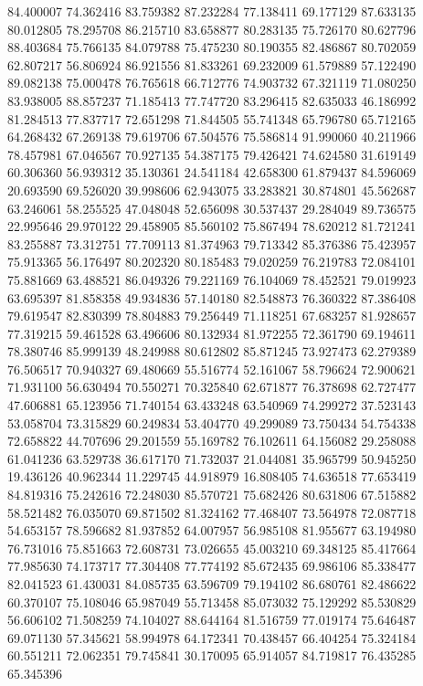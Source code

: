 84.400007
74.362416
83.759382
87.232284
77.138411
69.177129
87.633135
80.012805
78.295708
86.215710
83.658877
80.283135
75.726170
80.627796
88.403684
75.766135
84.079788
75.475230
80.190355
82.486867
80.702059
62.807217
56.806924
86.921556
81.833261
69.232009
61.579889
57.122490
89.082138
75.000478
76.765618
66.712776
74.903732
67.321119
71.080250
83.938005
88.857237
71.185413
77.747720
83.296415
82.635033
46.186992
81.284513
77.837717
72.651298
71.844505
55.741348
65.796780
65.712165
64.268432
67.269138
79.619706
67.504576
75.586814
91.990060
40.211966
78.457981
67.046567
70.927135
54.387175
79.426421
74.624580
31.619149
60.306360
56.939312
35.130361
24.541184
42.658300
61.879437
84.596069
20.693590
69.526020
39.998606
62.943075
33.283821
30.874801
45.562687
63.246061
58.255525
47.048048
52.656098
30.537437
29.284049
89.736575
22.995646
29.970122
29.458905
85.560102
75.867494
78.620212
81.721241
83.255887
73.312751
77.709113
81.374963
79.713342
85.376386
75.423957
75.913365
56.176497
80.202320
80.185483
79.020259
76.219783
72.084101
75.881669
63.488521
86.049326
79.221169
76.104069
78.452521
79.019923
63.695397
81.858358
49.934836
57.140180
82.548873
76.360322
87.386408
79.619547
82.830399
78.804883
79.256449
71.118251
67.683257
81.928657
77.319215
59.461528
63.496606
80.132934
81.972255
72.361790
69.194611
78.380746
85.999139
48.249988
80.612802
85.871245
73.927473
62.279389
76.506517
70.940327
69.480669
55.516774
52.161067
58.796624
72.900621
71.931100
56.630494
70.550271
70.325840
62.671877
76.378698
62.727477
47.606881
65.123956
71.740154
63.433248
63.540969
74.299272
37.523143
53.058704
73.315829
60.249834
53.404770
49.299089
73.750434
54.754338
72.658822
44.707696
29.201559
55.169782
76.102611
64.156082
29.258088
61.041236
63.529738
36.617170
71.732037
21.044081
35.965799
50.945250
19.436126
40.962344
11.229745
44.918979
16.808405
74.636518
77.653419
84.819316
75.242616
72.248030
85.570721
75.682426
80.631806
67.515882
58.521482
76.035070
69.871502
81.324162
77.468407
73.564978
72.087718
54.653157
78.596682
81.937852
64.007957
56.985108
81.955677
63.194980
76.731016
75.851663
72.608731
73.026655
45.003210
69.348125
85.417664
77.985630
74.173717
77.304408
77.774192
85.672435
69.986106
85.338477
82.041523
61.430031
84.085735
63.596709
79.194102
86.680761
82.486622
60.370107
75.108046
65.987049
55.713458
85.073032
75.129292
85.530829
56.606102
71.508259
74.104027
88.644164
81.516759
77.019174
75.646487
69.071130
57.345621
58.994978
64.172341
70.438457
66.404254
75.324184
60.551211
72.062351
79.745841
30.170095
65.914057
84.719817
76.435285
65.345396
